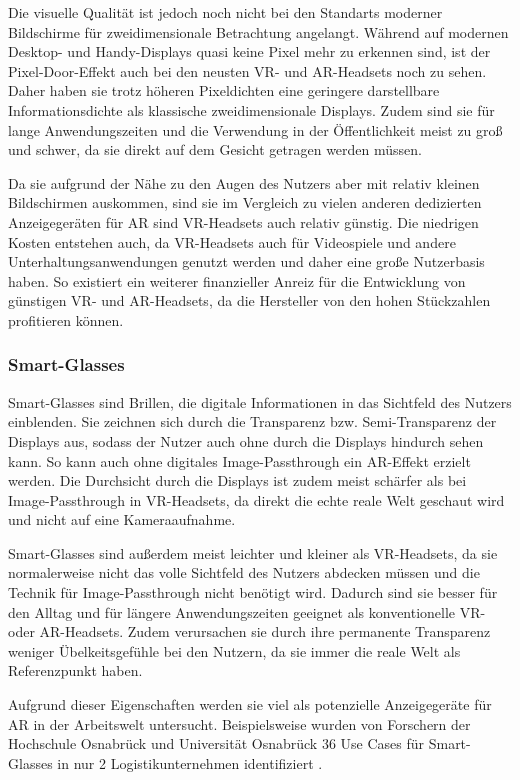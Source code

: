     Die visuelle Qualität ist jedoch noch nicht bei den Standarts moderner Bildschirme für zweidimensionale Betrachtung angelangt.
    Während auf modernen Desktop- und Handy-Displays quasi keine Pixel mehr zu erkennen sind, ist der Pixel-Door-Effekt auch bei den neusten VR- und AR-Headsets noch zu sehen.
    Daher haben sie trotz höheren Pixeldichten eine geringere darstellbare Informationsdichte als klassische zweidimensionale Displays.
    Zudem sind sie für lange Anwendungszeiten und die Verwendung in der Öffentlichkeit meist zu groß und schwer, da sie direkt auf dem Gesicht getragen werden müssen.

    Da sie aufgrund der Nähe zu den Augen des Nutzers aber mit relativ kleinen Bildschirmen auskommen, sind sie im Vergleich zu vielen anderen dedizierten Anzeigegeräten für AR sind VR-Headsets auch relativ günstig.
    Die niedrigen Kosten entstehen auch, da VR-Headsets auch für Videospiele und andere Unterhaltungsanwendungen genutzt werden und daher eine große Nutzerbasis haben.
    So existiert ein weiterer finanzieller Anreiz für die Entwicklung von günstigen VR- und AR-Headsets, da die Hersteller von den hohen Stückzahlen profitieren können.
   

    \subsubsection{Smart-Glasses}

    Smart-Glasses sind Brillen, die digitale Informationen in das Sichtfeld des Nutzers einblenden.
    Sie zeichnen sich durch die Transparenz bzw. Semi-Transparenz der Displays aus, sodass der Nutzer auch ohne durch die Displays hindurch sehen kann.
    So kann auch ohne digitales Image-Passthrough ein AR-Effekt erzielt werden.
    Die Durchsicht durch die Displays ist zudem meist schärfer als bei Image-Passthrough in VR-Headsets, da direkt die echte reale Welt geschaut wird und nicht auf eine Kameraaufnahme.

    Smart-Glasses sind außerdem meist leichter und kleiner als VR-Headsets, da sie normalerweise nicht das volle Sichtfeld des Nutzers abdecken müssen und die Technik für Image-Passthrough nicht benötigt wird.
    Dadurch sind sie besser für den Alltag und für längere Anwendungszeiten geeignet als konventionelle VR- oder AR-Headsets.
    Zudem verursachen sie durch ihre permanente Transparenz weniger Übelkeitsgefühle bei den Nutzern, da sie immer die reale Welt als Referenzpunkt haben.

    Aufgrund dieser Eigenschaften werden sie viel als potenzielle Anzeigegeräte für AR in der Arbeitswelt untersucht.
    Beispielsweise wurden von Forschern der Hochschule Osnabrück und Universität Osnabrück 36 Use Cases für Smart-Glasses in nur 2 Logistikunternehmen identifiziert \autocite[]{SmartGlasses2017}.


